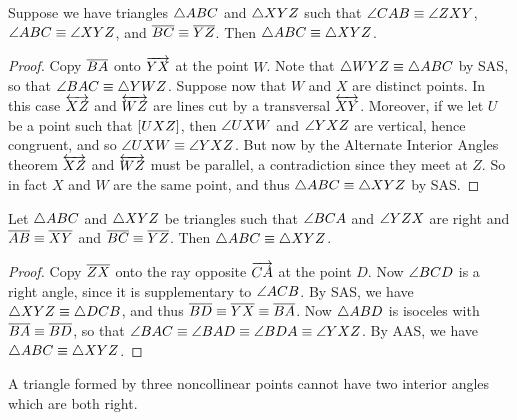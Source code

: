 \begin{prop}\label{prop:aas-theorem}
Suppose we have triangles \(\bigtriangleup{ABC}\) and \(\bigtriangleup{XYZ}\) such that \(\angle{CAB} \equiv \angle{ZXY}\), \(\angle{ABC} \equiv \angle{XYZ}\), and \(\overline{BC} \equiv \overline{YZ}\).
Then \(\bigtriangleup{ABC} \equiv \bigtriangleup{XYZ}\).
\end{prop}

\begin{proof}
Copy \(\overline{BA}\) onto \(\overrightarrow{YX}\) at the point \(W\).
Note that \(\bigtriangleup{WYZ} \equiv \bigtriangleup{ABC}\) by SAS, so that \(\angle{BAC} \equiv \bigtriangleup{YWZ}\).
Suppose now that \(W\) and \(X\) are distinct points.
In this case \(\overleftrightarrow{XZ}\) and \(\overleftrightarrow{WZ}\) are lines cut by a transversal \(\overleftrightarrow{XY}\).
Moreover, if we let \(U\) be a point such that \([ U X Z ]\), then \(\angle{UXW}\) and \(\angle{YXZ}\) are vertical, hence congruent, and so \(\angle{UXW} \equiv \angle{YXZ}\).
But now by the Alternate Interior Angles theorem \(\overleftrightarrow{XZ}\) and \(\overleftrightarrow{WZ}\) must be parallel, a contradiction since they meet at \(Z\).
So in fact \(X\) and \(W\) are the same point, and thus \(\bigtriangleup{ABC} \equiv \bigtriangleup{XYZ}\) by SAS.
\end{proof}

\begin{prop}[HL Theorem]
Let \(\bigtriangleup{ABC}\) and \(\bigtriangleup{XYZ}\) be triangles such that \(\angle{BCA}\) and \(\angle{YZX}\) are right and \(\overline{AB} \equiv \overline{XY}\) and \(\overline{BC} \equiv \overline{YZ}\).
Then \(\bigtriangleup{ABC} \equiv \bigtriangleup{XYZ}\).
\end{prop}

\begin{proof}
Copy \(\overline{ZX}\) onto the ray opposite \(\overrightarrow{CA}\) at the point \(D\).
Now \(\angle{BCD}\) is a right angle, since it is supplementary to \(\angle{ACB}\).
By SAS, we have \(\bigtriangleup{XYZ} \equiv \bigtriangleup{DCB}\), and thus \(\overline{BD} \equiv \overline{YX} \equiv \overline{BA}\).
Now \(\bigtriangleup{ABD}\) is isoceles with \(\overline{BA} \equiv \overline{BD}\), so that \(\angle{BAC} \equiv \angle{BAD} \equiv \angle{BDA} \equiv \angle{YXZ}\).
By AAS, we have \(\bigtriangleup{ABC} \equiv \bigtriangleup{XYZ}\).
\end{proof}

\begin{prop}
A triangle formed by three noncollinear points cannot have two interior angles which are both right.
\end{prop}

